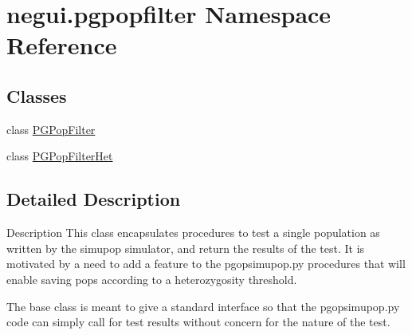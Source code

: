 \hypertarget{namespacenegui_1_1pgpopfilter}{}\section{negui.\+pgpopfilter Namespace Reference}
\label{namespacenegui_1_1pgpopfilter}
\subsection*{Classes}
\begin{DoxyCompactItemize}
\item 
class \hyperlink{classnegui_1_1pgpopfilter_1_1PGPopFilter}{P\+G\+Pop\+Filter}
\item 
class \hyperlink{classnegui_1_1pgpopfilter_1_1PGPopFilterHet}{P\+G\+Pop\+Filter\+Het}
\end{DoxyCompactItemize}


\subsection{Detailed Description}
\begin{DoxyVerb}Description
This class encapsulates procedures to test
a single population as written by the simupop
simulator, and return the results of the test.
It is motivated by a need to add a feature to
the pgopsimupop.py procedures that will enable
saving pops according to a heterozygosity threshold.

The base class is meant to give a standard interface
so that the pgopsimupop.py code can simply call
for test results without concern for the nature of 
the test.
\end{DoxyVerb}
 